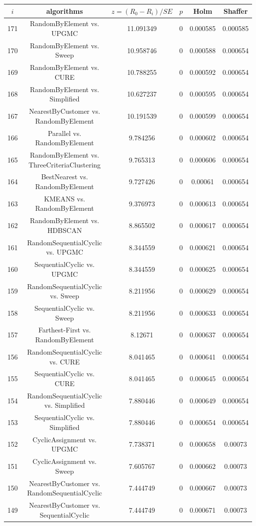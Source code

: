 \documentclass[a4paper,10pt]{article}
\begin{document}
\begin{landscape}
\begin{table}[!htp]
\centering\scriptsize
\begin{tabular}{cccccc}
$i$&algorithms&$z=(R_0 - R_i)/SE$&$p$&Holm&Shaffer\\
\hline171&RandomByElement vs. UPGMC&11.091349&0&0.000585&0.000585\\
170&RandomByElement vs. Sweep&10.958746&0&0.000588&0.000654\\
169&RandomByElement vs. CURE&10.788255&0&0.000592&0.000654\\
168&RandomByElement vs. Simplified&10.627237&0&0.000595&0.000654\\
167&NearestByCustomer vs. RandomByElement&10.191539&0&0.000599&0.000654\\
166&Parallel vs. RandomByElement&9.784256&0&0.000602&0.000654\\
165&RandomByElement vs. ThreeCriteriaClustering&9.765313&0&0.000606&0.000654\\
164&BestNearest vs. RandomByElement&9.727426&0&0.00061&0.000654\\
163&KMEANS vs. RandomByElement&9.376973&0&0.000613&0.000654\\
162&RandomByElement vs. HDBSCAN&8.865502&0&0.000617&0.000654\\
161&RandomSequentialCyclic vs. UPGMC&8.344559&0&0.000621&0.000654\\
160&SequentialCyclic vs. UPGMC&8.344559&0&0.000625&0.000654\\
159&RandomSequentialCyclic vs. Sweep&8.211956&0&0.000629&0.000654\\
158&SequentialCyclic vs. Sweep&8.211956&0&0.000633&0.000654\\
157&Farthest-First vs. RandomByElement&8.12671&0&0.000637&0.000654\\
156&RandomSequentialCyclic vs. CURE&8.041465&0&0.000641&0.000654\\
155&SequentialCyclic vs. CURE&8.041465&0&0.000645&0.000654\\
154&RandomSequentialCyclic vs. Simplified&7.880446&0&0.000649&0.000654\\
153&SequentialCyclic vs. Simplified&7.880446&0&0.000654&0.000654\\
152&CyclicAssignment vs. UPGMC&7.738371&0&0.000658&0.00073\\
151&CyclicAssignment vs. Sweep&7.605767&0&0.000662&0.00073\\
150&NearestByCustomer vs. RandomSequentialCyclic&7.444749&0&0.000667&0.00073\\
149&NearestByCustomer vs. SequentialCyclic&7.444749&0&0.000671&0.00073\\

\end{tabular}
\end{table}
\end{landscape}
\end{document}

